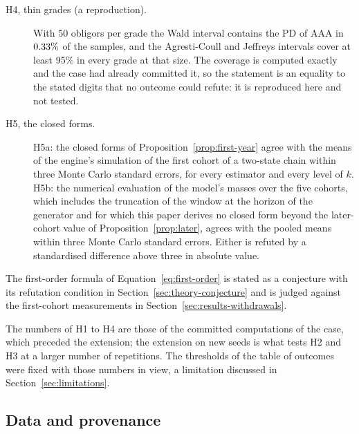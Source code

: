 \begin{description}
\item[H4, thin grades (a reproduction).] With 50 obligors per grade the Wald interval contains the PD of AAA in $0.33\%$ of the samples, and the Agresti-Coull and Jeffreys intervals cover at least 95\% in every grade at that size. The coverage is computed exactly and the case had already committed it, so the statement is an equality to the stated digits that no outcome could refute: it is reproduced here and not tested.
\item[H5, the closed forms.] H5a: the closed forms of Proposition~\ref{prop:first-year} agree with the means of the engine's simulation of the first cohort of a two-state chain within three Monte Carlo standard errors, for every estimator and every level of $k$. H5b: the numerical evaluation of the model's masses over the five cohorts, which includes the truncation of the window at the horizon of the generator and for which this paper derives no closed form beyond the later-cohort value of Proposition~\ref{prop:later}, agrees with the pooled means within three Monte Carlo standard errors. Either is refuted by a standardised difference above three in absolute value.
\end{description}
The first-order formula of Equation~\eqref{eq:first-order} is stated as a conjecture with its refutation condition in Section~\ref{sec:theory-conjecture} and is judged against the first-cohort measurements in Section~\ref{sec:results-withdrawals}.

The numbers of H1 to H4 are those of the committed computations of the case, which preceded the extension; the extension on new seeds is what tests H2 and H3 at a larger number of repetitions. The thresholds of the table of outcomes were fixed with those numbers in view, a limitation discussed in Section~\ref{sec:limitations}.

\subsection{Data and provenance}
\label{sec:design-data}

